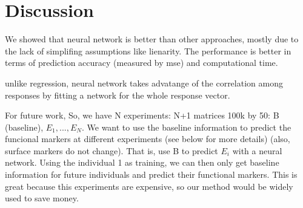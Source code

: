 \documentclass[graybox]{svmult}
\begin{document}
\section{Discussion}

We showed that neural network is better than other approaches, mostly
due to the lack of simplifing assumptions like lienarity. The
performance is better in terms of prediction accuracy (measured by
mse) and computational time.

unlike regression, neural network takes advatange of the correlation
among responses by fitting a network for the whole response vector.

For future work, So, we have N experiments: N+1 matrices 100k by 50: B
(baseline), $E_1,...,E_N$. We want to use the baseline information to
predict the funcional markers at different experiments (see below for
more details) (also, surface markers do not change). That is, use B to
predict $E_i$ with a neural network. Using the individual 1 as
training, we can then only get baseline information for future
individuals and predict their functional markers. This is great
because this experiments are expensive, so our method would be widely
used to save money.



\end{document}
